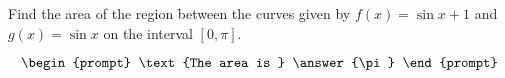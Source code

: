 \documentclass{ximera}
\author{Gregory Hartman \and Matthew Carr}
\begin{document}
\begin{exercise}






Find the area of the region between the curves given by $f(x)=\sin x+1$ and $g(x)=\sin x$ on the interval $[0,\pi]$.

\[
\begin{prompt}
\text{The area is } \answer{\pi}
\end{prompt}
\]




\end{exercise}
\end{document}

